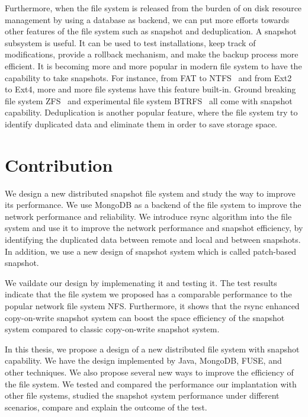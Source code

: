     Furthermore, when the file system is released from the burden of on disk resource management by using a database as backend, we can put more efforts towards other features of the file system such as snapshot and deduplication. A snapshot subsystem is useful. It can be used to test installations, keep track of modifications, provide a rollback mechanism, and make the backup process more efficient. It is becoming more and more popular in modern file system to have the capability to take snapshots. For instance, from FAT to NTFS~\cite{ntfs} and from Ext2~\cite{ext2_wiki} to Ext4, more and more file systems have this feature built-in. Ground breaking file system ZFS~\cite{zfs_wiki} and experimental file system BTRFS~\cite{btrfs} all come with snapshot capability. Deduplication is another popular feature, where the file system try to identify duplicated data and eliminate them in order to save storage space.

\section{Contribution}

    We design a new distributed snapshot file system and study the way to improve its performance. We use MongoDB as a backend of the file system to improve the network performance and reliability. We introduce rsync algorithm into the file system and use it to improve the network performance and snapshot efficiency, by identifying the duplicated data between remote and local and between snapshots. In addition, we use a new design of snapshot system which is called patch-based snapshot. 

    We vaildate our design by implemenating it and testing it. The test results indicate that the file system we proposed has a comparable performance to the popular network file system NFS. Furthermore, it shows that the rsync enhanced copy-on-write snapshot system can boost the space efficiency of the snapshot system compared to classic copy-on-write snapshot system.

    In this thesis, we propose a design of a new distributed file system with snapshot capability. We have the design implemented by Java, MongoDB, FUSE, and other techniques. We also propose several new ways to improve the efficiency of the file system. We tested and compared the performance our implantation with other file systems, studied the snapshot system performance under different scenarios, compare and explain the outcome of the test.
